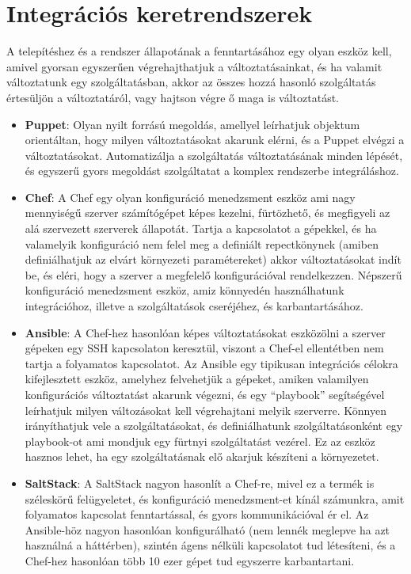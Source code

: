 \documentclass[11pt,magyar,a4paper,oneside,]{report}
\begin{document}
\section{Integrációs
keretrendszerek}\label{integruxe1ciuxf3s-keretrendszerek}

A telepítéshez és a rendszer állapotának a fenntartásához egy olyan
eszköz kell, amivel gyorsan egyszerűen végrehajthatjuk a
változtatásainkat, és ha valamit változtatunk egy szolgáltatásban, akkor
az összes hozzá hasonló szolgáltatás értesüljön a változtatáról, vagy
hajtson végre ő maga is változtatást.

\begin{itemize}
\item
  \textbf{Puppet}: Olyan nyilt forrású megoldás, amellyel leírhatjuk
  objektum orientáltan, hogy milyen változtatásokat akarunk elérni, és a
  Puppet elvégzi a változtatásokat. Automatizálja a szolgáltatás
  változtatásának minden lépését, és egyszerű gyors megoldást
  szolgáltatat a komplex rendszerbe integráláshoz.
\item
  \textbf{Chef}: A Chef egy olyan konfiguráció menedzsment eszköz ami
  nagy mennyiségű szerver számítógépet képes kezelni, fürtözhető, és
  megfigyeli az alá szervezett szerverek állapotát. Tartja a kapcsolatot
  a gépekkel, és ha valamelyik konfiguráció nem felel meg a definiált
  repectkönynek (amiben definiálhatjuk az elvárt környezeti
  paramétereket) akkor változtatásokat indít be, és eléri, hogy a
  szerver a megfelelő konfigurációval rendelkezzen. Népszerű
  konfiguráció menedzsment eszköz, amiz könnyedén használhatunk
  integrációhoz, illetve a szolgáltatások cseréjéhez, és
  karbantartásához.
\item
  \textbf{Ansible}: A Chef-hez hasonlóan képes változtatásokat
  eszközölni a szerver gépeken egy SSH kapcsolaton keresztül, viszont a
  Chef-el ellentétben nem tartja a folyamatos kapcsolatot. Az Ansible
  egy tipikusan integrációs célokra kifejlesztett eszköz, amelyhez
  felvehetjük a gépeket, amiken valamilyen konfigurációs változtatást
  akarunk végezni, és egy ``playbook'' segítségével leírhatjuk milyen
  változásokat kell végrehajtani melyik szerverre. Könnyen irányíthatjuk
  vele a szolgáltatásokat, és definiálhatunk szolgáltatásonként egy
  playbook-ot ami mondjuk egy fürtnyi szolgáltatást vezérel. Ez az
  eszköz hasznos lehet, ha egy szolgáltatásnak elő akarjuk készíteni a
  környezetet.
\item
  \textbf{SaltStack}: A SaltStack nagyon hasonlít a Chef-re, mivel ez a
  termék is széleskörű felügyeletet, és konfiguráció menedzsment-et
  kínál számunkra, amit folyamatos kapcsolat fenntartással, és gyors
  kommunikációval ér el. Az Ansible-höz nagyon hasonlóan konfigurálható
  (nem lennék meglepve ha azt használná a háttérben), szintén ágens
  nélküli kapcsolatot tud létesíteni, és a Chef-hez hasonlóan több 10
  ezer gépet tud egyszerre karbantartani.
\end{itemize}
\end{document}
